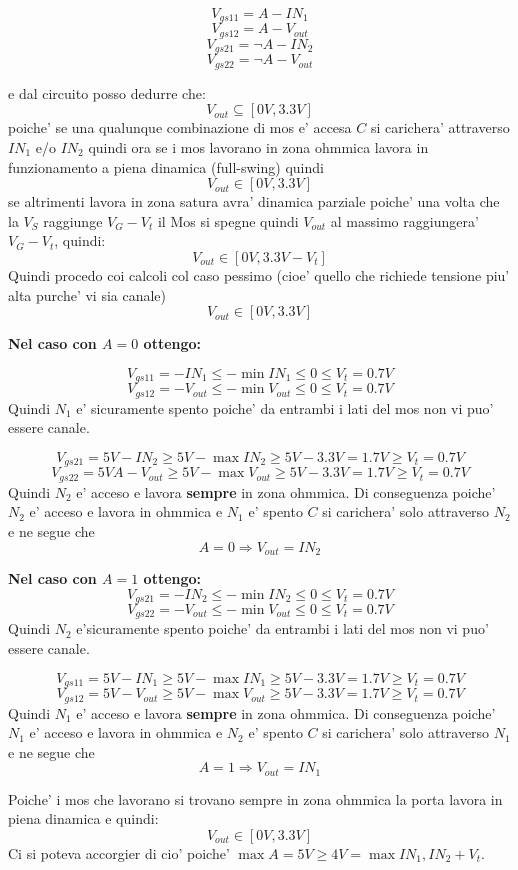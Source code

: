 \documentclass[\main/main.tex]{subfiles}
\begin{document}
\[V_{gs11} = A - IN_1\]
\[V_{gs12} = A - V_{out}\]
\[V_{gs21} = \neg A - IN_2\]
\[V_{gs22} = \neg A - V_{out}\]

e dal circuito posso dedurre che:
\[V_{out} \subseteq  [0V,3.3V]\]
poiche' se una qualunque combinazione di mos e' accesa $C$ si carichera' attraverso $IN_1$ e/o $IN_2$ quindi ora se i mos lavorano in zona ohmmica lavora in funzionamento a piena dinamica (full-swing) quindi 
\[V_{out} \in [0V,3.3V]\]
se altrimenti lavora in zona satura avra' dinamica parziale poiche' una volta che la $V_S$ raggiunge $V_G - V_t$ il Mos si spegne quindi $V_{out}$ al massimo raggiungera' $V_G - V_t$, quindi:
\[V_{out} \in [0V,3.3V-V_t]\]
Quindi procedo coi calcoli col caso pessimo (cioe' quello che richiede tensione piu' alta purche' vi sia canale) 
\[V_{out} \in [0V,3.3V]\]

\textbf{Nel caso con $A = 0$ ottengo:}

\[V_{gs11} =  - IN_1 \le -\min{IN_1} \le 0 \le V_t = 0.7V\]
\[V_{gs12} =  - V_{out} \le -\min{V_{out}} \le 0 \le V_t = 0.7V\]
Quindi $N_1$ e' sicuramente spento poiche' da entrambi i lati del mos non vi puo' essere canale.

\[V_{gs21} = 5V- IN_2 \ge 5V - \max{IN_2} \ge 5V - 3.3V = 1.7V \ge V_t = 0.7V\]
\[V_{gs22} = 5V A - V_{out} \ge 5V - \max{V_{out}} \ge 5V - 3.3V = 1.7V \ge V_t = 0.7V\]
Quindi $N_2$ e' acceso e lavora \textbf{sempre} in zona ohmmica.
Di conseguenza poiche' $N_2$ e' acceso e lavora in ohmmica e $N_1$ e' spento $C$ si carichera' solo attraverso $N_2$ e ne segue che  \[ A = 0 \Rightarrow V_{out} = IN_2\]

\textbf{Nel caso con $A = 1$ ottengo:}
\[V_{gs21} =  - IN_2 \le -\min{IN_2} \le 0 \le V_t = 0.7V\]
\[V_{gs22} =  - V_{out} \le -\min{V_{out}} \le 0 \le V_t = 0.7V\]
Quindi $N_2$ e'sicuramente spento poiche' da entrambi i lati del mos non vi puo' essere canale.

\[V_{gs11} = 5V - IN_1\ge 5V - \max{IN_1} \ge 5V - 3.3V = 1.7V \ge V_t = 0.7V\]
\[V_{gs12} = 5V - V_{out}\ge 5V - \max{V_{out}} \ge 5V - 3.3V = 1.7V \ge V_t = 0.7V\]
Quindi $N_1$ e' acceso e lavora \textbf{sempre} in zona ohmmica.
Di conseguenza poiche' $N_1$ e' acceso e lavora in ohmmica e $N_2$ e' spento $C$ si carichera' solo attraverso $N_1$ e ne segue che  \[ A = 1 \Rightarrow V_{out} = IN_1\]

Poiche' i mos che lavorano si trovano sempre in zona ohmmica la porta lavora in piena dinamica e quindi:
\[V_{out} \in [0V,3.3V]\]
Ci si poteva accorgier di cio' poiche' $\max{A} = 5V \ge 4V = \max{IN_1,IN_2} + V_t$.
\end{document}
